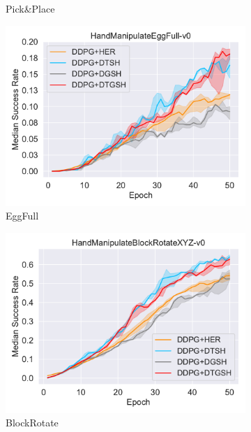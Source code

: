 \begin{figure}[h!]
\begin{subfigure}[t]{0.49\textwidth}
    \caption{Pick\&Place}
    \label{subfig:baseline_pick_ab1}
  \end{subfigure}\hfill
  \begin{subfigure}[t]{0.49\textwidth}
    \includegraphics[width=\textwidth]{figures/chapter4/HandManipulateEggFull-v0_ab1.pdf}
    \caption{EggFull}
    \label{subfig:baseline_handegg_ab1}
  \end{subfigure}\hfill
  \begin{subfigure}[t]{0.49\textwidth}
    \includegraphics[width=\textwidth]{figures/chapter4/HandManipulateBlockRotateXYZ-v0_ab1.pdf}
    \caption{BlockRotate}
    \label{subfig:baseline_handblock_ab1}
  \end{subfigure}\hfill
  \begin{subfigure}[t]{0.49\textwidth}

\end{subfigure}
\end{figure}
